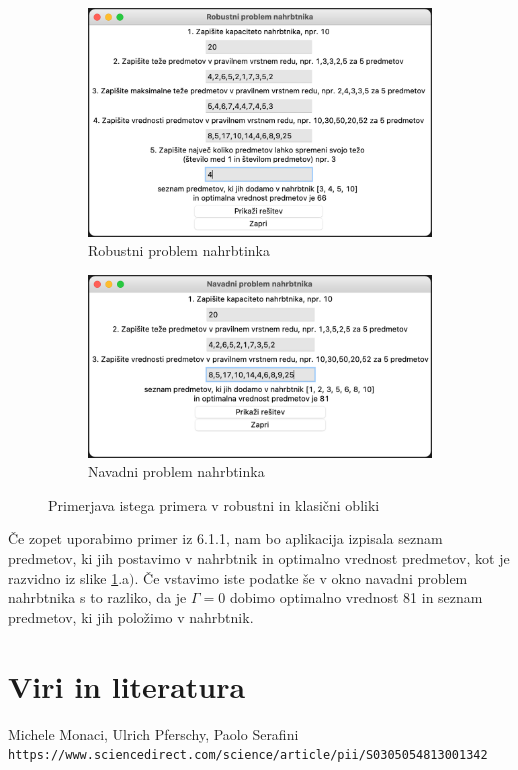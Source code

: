 \documentclass[a4paper,12pt]{article}
\theoremstyle{definition}
\begin{document}
\begin{figure}[h!]
    \centering
    \begin{subfigure}[b]{0.8\linewidth}
      \includegraphics[width=\linewidth]{graficni_prikaz_RKP.png}
      \caption{Robustni problem nahrbtinka}
      \smallskip
    \end{subfigure}
    \begin{subfigure}[b]{0.8\linewidth}
      \includegraphics[width=\linewidth]{graficni_prikaz_KP.png}
      \caption{Navadni problem nahrbtinka}
    \end{subfigure}
    \caption{Primerjava istega primera v robustni in klasični obliki}
    \label{fig:koda2}
  \end{figure}

\noindent Če zopet uporabimo primer iz 6.1.1, nam bo aplikacija izpisala seznam predmetov, ki jih 
postavimo v nahrbtnik in optimalno vrednost predmetov, kot je razvidno iz slike \ref{fig:koda2}.a$)$. Če vstavimo 
iste podatke še v okno navadni problem nahrbtnika s to razliko, da je $\Gamma = 0$ dobimo optimalno vrednost 81 in 
seznam predmetov, ki jih položimo v nahrbtnik.

\newpage
\section{Viri in literatura}

\begin{thebibliography}{9}

    Michele Monaci, Ulrich Pferschy, Paolo Serafini 
    \\\texttt{https://www.sciencedirect.com/science/article/pii/S0305054813001342}


\end{thebibliography}
\end{document}
